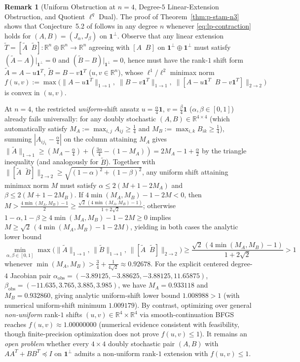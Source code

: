 \documentclass[11pt,a4paper]{article}
\theoremstyle{definition}
\newtheorem{remark}[theorem]{Remark}
\newcommand{\R}{\mathbb{R}}
\newcommand{\one}{\mathbf{1}}
\begin{document}
\begin{remark}[Uniform Obstruction at $n = 4$, Degree-$5$ Linear-Extension Obstruction, and Quotient $\ell^q$ Dual]
\label{rem:lp-n4-obstruction}
The proof of Theorem~\ref{thm:p-stam-n3} shows that Conjecture~5.2 of \cite{Hashemi2026} follows in any degree $n$ whenever \eqref{eq:lp-contraction} holds for $(A, B) = (J_\alpha, J_\beta)$ on $\one^\perp$. Observe that any linear extension $\tilde{T} = [\tilde{A}\;\;\tilde{B}] : \R^n \oplus \R^n \to \R^n$ agreeing with $[A\;\;B]$ on $\one^\perp \oplus \one^\perp$ must satisfy $(\tilde{A} - A)|_{\one^\perp} = 0$ and $(\tilde{B} - B)|_{\one^\perp} = 0$, hence must have the rank-$1$ shift form $\tilde{A} = A - u\one^T$, $\tilde{B} = B - v\one^T$ ($u, v \in \R^n$), whose $\ell^1$/$\ell^2$ minimax norm
\[
f(u, v) := \max\!\big(\|A - u\one^T\|_{1\to 1},\; \|B - v\one^T\|_{1\to 1},\; \|[A - u\one^T\;\; B - v\one^T]\|_{2\to 2}\big)
\]
is convex in $(u, v)$.

At $n = 4$, the restricted \emph{uniform}-shift ansatz $u = \frac{\alpha}{4}\one$, $v = \frac{\beta}{4}\one$ ($\alpha,\beta \in [0,1]$) already fails universally: for any doubly stochastic $(A,B) \in \R^{4\times 4}$ (which automatically satisfy $M_A := \max_{i,j} A_{ij} \ge \frac{1}{4}$ and $M_B := \max_{i,k} B_{ik} \ge \frac{1}{4}$), summing $|A_{ij_1} - \frac{\alpha}{4}|$ on the column attaining $M_A$ gives $\|\tilde{A}\|_{1\to 1} \ge (M_A - \frac{\alpha}{4}) + (\frac{3\alpha}{4} - (1-M_A)) = 2M_A - 1 + \frac{\alpha}{2}$ by the triangle inequality (and analogously for $\tilde{B}$). Together with $\|[\tilde{A}\;\;\tilde{B}]\|_{2\to 2} \ge \sqrt{(1-\alpha)^2 + (1-\beta)^2}$, any uniform shift attaining minimax norm $M$ must satisfy $\alpha \le 2(M + 1 - 2M_A)$ and $\beta \le 2(M + 1 - 2M_B)$. If $4\min(M_A, M_B) - 1 - 2M < 0$, then $M > \frac{4\min(M_A, M_B) - 1}{2} \ge \frac{\sqrt{2}\,(4\min(M_A, M_B) - 1)}{1 + 2\sqrt{2}}$; otherwise $1-\alpha, 1-\beta \ge 4\min(M_A, M_B) - 1 - 2M \ge 0$ implies $M \ge \sqrt{2}\,(4\min(M_A, M_B) - 1 - 2M)$, yielding in both cases the analytic lower bound
\[
\min_{\alpha,\beta \in [0,1]} \max\!\big(\|\tilde{A}\|_{1\to 1},\, \|\tilde{B}\|_{1\to 1},\, \|[\tilde{A}\;\;\tilde{B}]\|_{2\to 2}\big) \ge \frac{\sqrt{2}\,(4\min(M_A, M_B) - 1)}{1 + 2\sqrt{2}} > 1
\]
whenever $\min(M_A, M_B) > \frac{3}{4} + \frac{1}{4\sqrt{2}} \approx 0.92678$. For the explicit centered degree-$4$ Jacobian pair $\alpha_{\mathrm{obs}} = (-3.89125, -3.88625, -3.88125, 11.65875)$, $\beta_{\mathrm{obs}} = (-11.635, 3.765, 3.885, 3.985)$, we have $M_A = 0.933118$ and $M_B = 0.932860$, giving analytic uniform-shift lower bound $1.008988 > 1$ (with numerical uniform-shift minimum $1.009179$). By contrast, optimizing over general \emph{non-uniform} rank-$1$ shifts $(u, v) \in \R^4 \times \R^4$ via smooth-continuation BFGS reaches $f(u,v) \approx 1.00000000$ (numerical evidence consistent with feasibility, though finite-precision optimization does not prove $f(u,v) \le 1$). It remains an \emph{open problem} whether every $4 \times 4$ doubly stochastic pair $(A, B)$ with $AA^T + BB^T \preceq I$ on $\one^\perp$ admits a non-uniform rank-$1$ extension with $f(u, v) \le 1$.


\end{remark}
\end{document}
